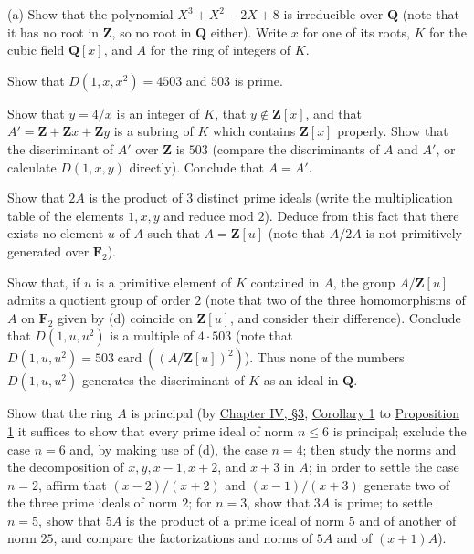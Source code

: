  (a) Show that the polynomial $X^{3}+X^{2}-2X+8$ is irreducible
over $\mathbf{Q}$ (note that it has no root in $\mathbf{Z}$, so no root in
$\mathbf{Q}$ either). Write $x$ for one of its roots, $K$ for the cubic
field $\mathbf{Q}[x]$, and $A$ for the ring of integers of $K$.
\begin{alist}
\item Show that $D(1,x,x^{2})=4503$ and $503$ is prime.
\item Show that $y=4/x$ is an integer of $K$, that $y\notin\mathbf{Z}[x]$,
and that $A'=\mathbf{Z}+\mathbf{Z}x+\mathbf{Z}y$ is a subring of $K$ which
contains $\mathbf{Z}[x]$ properly. Show that the discriminant of $A'$ over
$\mathbf{Z}$ is $503$ (compare the discriminants of $A$ and $A'$, or
calculate $D(1,x,y)$ directly). Conclude that $A=A'$.
\item Show that $2A$ is the product of $3$ distinct prime ideals (write the
multiplication table of the elements $1,x,y$ and reduce mod $2$). Deduce
from this fact that there exists no element $u$ of $A$ such that
$A=\mathbf{Z}[u]$ (note that $A/2A$ is not primitively generated over
$\mathbf{F}_{2}$).
\item Show that, if $u$ is a primitive element of $K$ contained in $A$, the
group $A/\mathbf{Z}[u]$ admits a quotient group of order $2$ (note that two
of the three homomorphisms of $A$ on $\mathbf{F}_{2}$ given by (d) coincide
on $\mathbf{Z}[u]$, and consider their difference). Conclude that
$D(1,u,u^{2})$ is a multiple of $4\cdot503$ (note that
$D(1,u,u^{2})=503\operatorname{card}((A/\mathbf{Z}[u])^{2})$). Thus none of
the numbers $D(1,u,u^{2})$ generates the discriminant of $K$ as an ideal in
$\mathbf{Q}$.
\item Show that the ring $A$ is principal (by \hyperref[sec:4.3]{Chapter IV, §3}, \hyperref[cor:IV.3.1]{Corollary 1} to
\hyperref[prop:IV.3.1]{Proposition 1} it suffices to show that every prime ideal of norm $n\leq6$
is principal; exclude the case $n=6$ and, by making use of (d), the case
$n=4$; then study the norms and the decomposition of $x,y,x-1,x+2$, and
$x+3$ in $A$; in order to settle the case $n=2$, affirm that $(x-2)/(x+2)$
and $(x-1)/(x+3)$ generate two of the three prime ideals of norm $2$; for
$n=3$, show that $3A$ is prime; to settle $n=5$, show that $5A$ is the
product of a prime ideal of norm $5$ and of another of norm $25$, and
compare the factorizations and norms of $5A$ and of $(x+1)A$).
\end{alist}

